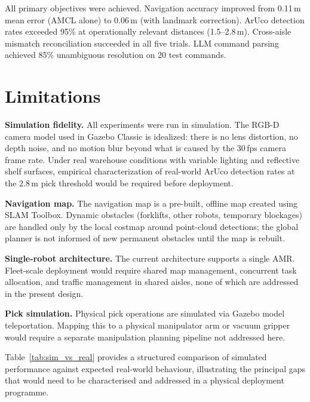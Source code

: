 \documentclass[12pt,a4paper]{report}
\begin{document}
All primary objectives were achieved. Navigation accuracy improved from 0.11\,m mean error (AMCL alone) to 0.06\,m (with landmark correction). ArUco detection rates exceeded 95\% at operationally relevant distances (1.5–2.8\,m). Cross-aisle mismatch reconciliation succeeded in all five trials. LLM command parsing achieved 85\% unambiguous resolution on 20 test commands.

\section{Limitations}

\textbf{Simulation fidelity.} All experiments were run in simulation. The RGB-D camera model used in Gazebo Classic is idealized: there is no lens distortion, no depth noise, and no motion blur beyond what is caused by the 30\,fps camera frame rate. Under real warehouse conditions with variable lighting and reflective shelf surfaces, empirical characterization of real-world ArUco detection rates at the 2.8\,m pick threshold would be required before deployment.

\textbf{Navigation map.} The navigation map is a pre-built, offline map created using SLAM Toolbox. Dynamic obstacles (forklifts, other robots, temporary blockages) are handled only by the local costmap around point-cloud detections; the global planner is not informed of new permanent obstacles until the map is rebuilt.

\textbf{Single-robot architecture.} The current architecture supports a single AMR. Fleet-scale deployment would require shared map management, concurrent task allocation, and traffic management in shared aisles, none of which are addressed in the present design.

\textbf{Pick simulation.} Physical pick operations are simulated via Gazebo model teleportation. Mapping this to a physical manipulator arm or vacuum gripper would require a separate manipulation planning pipeline not addressed here.

Table~\ref{tab:sim_vs_real} provides a structured comparison of simulated performance against expected real-world behaviour, illustrating the principal gaps that would need to be characterised and addressed in a physical deployment programme.
\end{document}
